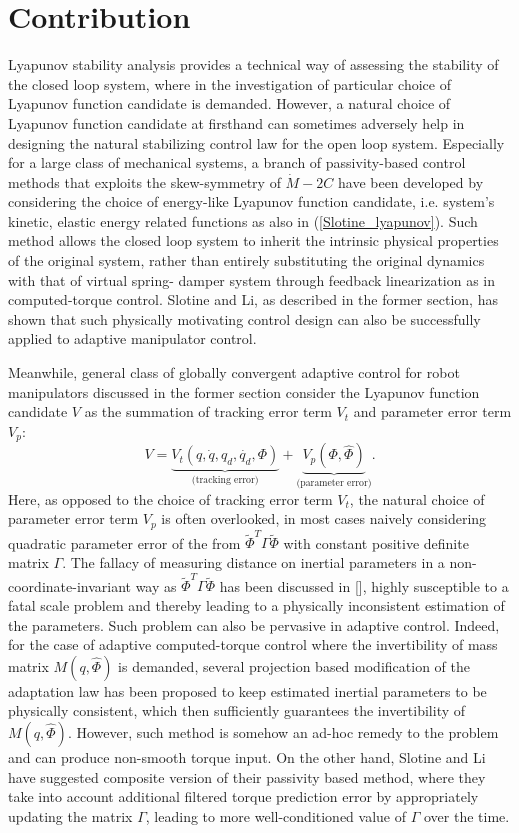\documentclass[Afour,sageh,times]{sagej}
\begin{document}
\section{Contribution}
Lyapunov stability analysis provides a technical way of assessing the stability of the closed loop system, where in the investigation of particular choice of Lyapunov function candidate is demanded. However, a natural choice of Lyapunov function candidate at firsthand can sometimes adversely help in designing the natural stabilizing control law for the open loop system. Especially for a large class of mechanical systems, a branch of passivity-based control methods that exploits the skew-symmetry of $\dot{M} - 2C$ have been developed by considering the choice of energy-like Lyapunov function candidate, i.e. system's kinetic, elastic energy related functions as also in (\ref{Slotine_lyapunov}). Such method allows the closed loop system to inherit the intrinsic physical properties of the original system, rather than entirely substituting the original dynamics with that of virtual spring- damper system through feedback linearization as in computed-torque control. Slotine and Li, as described in the former section, has shown that such physically motivating control design can also be successfully applied to adaptive manipulator control.

Meanwhile, general class of globally convergent adaptive control for robot manipulators discussed in the former section consider the Lyapunov function candidate $V$ as the summation of tracking error term $V_t$ and parameter error term $V_p$:
\begin{equation}
V = \underbrace{V_t(q,\dot{q},q_{d},\dot{q_{d}},\Phi)}_{\text{(tracking error)}} + \underbrace{V_p(\Phi, \hat{\Phi})}_{\text{(parameter error)}}.
\end{equation}
Here, as opposed to the choice of tracking error term $V_{t}$, the natural choice of parameter error term $V_{p}$ is often overlooked, in most cases naively considering quadratic parameter error of the from $\tilde{\Phi}^{T}\Gamma\tilde{\Phi}$ with constant positive definite matrix $\Gamma$. The fallacy of measuring distance on inertial parameters in a non-coordinate-invariant way as $\tilde{\Phi}^{T}\Gamma\tilde{\Phi}$ has been discussed in [], highly susceptible to a fatal scale problem and thereby leading to a physically inconsistent estimation of the parameters. Such problem can also be pervasive in adaptive control. Indeed, for the case of adaptive computed-torque control where the invertibility of mass matrix $M(q,\hat{\Phi})$ is demanded, several projection based modification of the adaptation law has been proposed to keep estimated inertial parameters to be physically consistent, which then sufficiently guarantees the invertibility of $M(q,\hat{\Phi})$. However, such method is somehow an ad-hoc remedy to the problem and can produce non-smooth torque input. On the other hand, Slotine and Li have suggested composite version of their passivity based method, where they take into account additional filtered torque prediction error by appropriately updating the matrix $\Gamma$, leading to more well-conditioned value of $\Gamma$ over the time.
\end{document}
